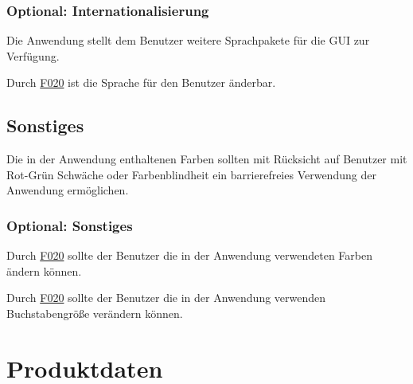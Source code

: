 \documentclass[parskip=full]{scrartcl}
\begin{document}
\subsubsection{Optional: Internationalisierung}

\begin{description}

\hypertarget{link-f500}{\item[(opt.) F500]} Die Anwendung stellt dem Benutzer weitere Sprachpakete für die \gls{GUI} zur Verfügung.
\hypertarget{link-f510}{\item[(opt.) F510]} Durch \hyperlink{link-f020}{F020} ist die Sprache für den Benutzer änderbar.

\end{description}

\subsection{Sonstiges}


\begin{description}

\hypertarget{link-f520}{\item[F520]} Die in der Anwendung enthaltenen Farben sollten mit Rücksicht auf Benutzer mit Rot-Grün Schwäche oder Farbenblindheit ein barrierefreies Verwendung der Anwendung ermöglichen.

\end{description}

\subsubsection{Optional: Sonstiges}

\begin{description}

\hypertarget{link-f530}{\item[(opt.) F530]} Durch \hyperlink{link-f020}{F020} sollte der Benutzer die in der Anwendung verwendeten Farben ändern können.
\hypertarget{link-f540}{\item[(opt.) F540]} Durch \hyperlink{link-f020}{F020} sollte der Benutzer die in der Anwendung verwenden Buchstabengröße verändern können.

\end{description}

\clearpage
\section{Produktdaten}\label{produktdaten}
\end{document}
